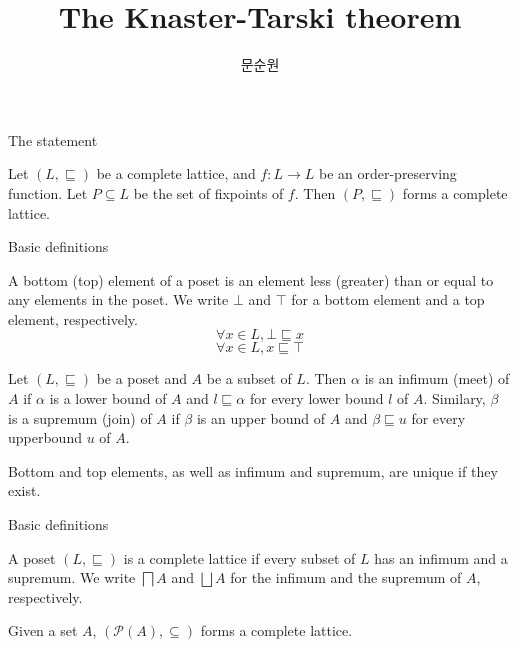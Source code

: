 \documentclass[9pt]{beamer}
\title{The Knaster-Tarski theorem}
\author{문순원}
\newcommand\pow[1]{\mathcal{P}(#1)}
\begin{document}
\begin{frame}
  \titlepage
\end{frame}

\begin{frame}{The statement}
  \begin{theorem}
    Let $(L,\sqsubseteq)$ be a complete lattice, and $f : L \to L$ be an order-preserving function. Let $P \subseteq L$ be the set of fixpoints of $f$. Then $(P, \sqsubseteq)$ forms a complete lattice.
  \end{theorem}
\end{frame}

\begin{frame}{Basic definitions}
  \begin{definition}
    A bottom (top) element of a poset is an element less (greater) than or equal to any elements in the poset.
    We write $\bot$ and $\top$ for a bottom element and a top element, respectively.
    $$
    \forall x \in L, \bot \sqsubseteq x
    $$
    $$
    \forall x \in L, x \sqsubseteq \top
    $$
  \end{definition}


  \begin{definition}
    Let $(L,\sqsubseteq)$ be a poset and $A$ be a subset of $L$.
    Then $\alpha$ is an infimum (meet) of $A$ if $\alpha$ is a lower bound of $A$
    and $l \sqsubseteq \alpha$ for every lower bound $l$ of $A$.
    Similary, $\beta$ is a supremum (join) of $A$ if $\beta$ is an upper bound of $A$
    and $\beta \sqsubseteq u$ for every upperbound $u$ of $A$.
  \end{definition}

  Bottom and top elements, as well as infimum and supremum, are unique if they exist.
\end{frame}

\begin{frame}{Basic definitions}
  \begin{definition}
    A poset $(L, \sqsubseteq)$ is a complete lattice if
    every subset of $L$ has an infimum and a supremum.
    We write $\bigsqcap A$ and $\bigsqcup A$ for the infimum and the supremum of $A$, respectively.
  \end{definition}

  \begin{example}
    Given a set $A$, $(\pow{A}, \subseteq)$ forms a complete lattice.
  \end{example}
\end{frame}
\end{document}
